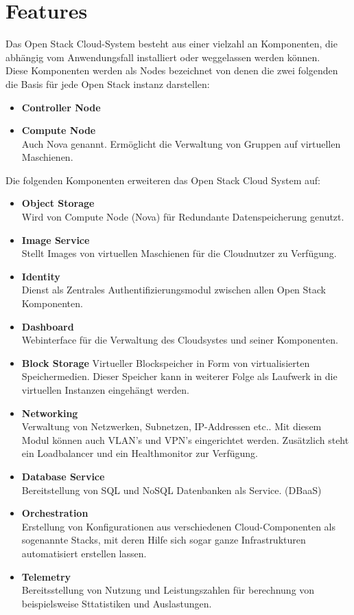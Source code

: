 \documentclass[a4paper,nochapterprefix,english,12pt]{scrreprt}
\begin{document}
\section{Features}
Das Open Stack Cloud-System besteht aus einer vielzahl an Komponenten, die abhängig vom Anwendungsfall installiert oder weggelassen werden können.\\
Diese Komponenten werden als Nodes bezeichnet von denen die zwei folgenden die Basis für jede Open Stack instanz darstellen:
\begin{itemize}
	\item \textbf{Controller Node}
	\item \textbf{Compute Node}\\
		  Auch Nova genannt. Ermöglicht die Verwaltung von Gruppen auf virtuellen Maschienen.\\
\end{itemize}
Die folgenden Komponenten erweiteren das Open Stack Cloud System auf:
\begin{itemize}
	\item \textbf{Object Storage}\\
		Wird von Compute Node (Nova) für Redundante Datenspeicherung genutzt.
	\item \textbf{Image Service}\\
		Stellt Images von virtuellen Maschienen für die Cloudnutzer zu Verfügung.
	\item \textbf{Identity}\\
		Dienst als Zentrales Authentifizierungsmodul zwischen allen Open Stack Komponenten.
	\item \textbf{Dashboard}\\
		Webinterface für die Verwaltung des Cloudsystes und seiner Komponenten.
	\item \textbf{Block Storage}
		Virtueller Blockspeicher in Form von virtualisierten Speichermedien. Dieser Speicher kann in weiterer Folge als Laufwerk in die virtuellen Instanzen eingehängt werden.
	\item \textbf{Networking}\\
		Verwaltung von Netzwerken, Subnetzen, IP-Addressen etc.. Mit diesem Modul können auch VLAN's und VPN's eingerichtet werden. Zusätzlich steht ein Loadbalancer und ein Healthmonitor zur Verfügung.
	\item \textbf{Database Service}\\
		Bereitstellung von SQL und NoSQL Datenbanken als Service. (DBaaS)
	\item \textbf{Orchestration}\\
		Erstellung von Konfigurationen aus verschiedenen Cloud-Componenten als sogenannte Stacks, mit deren Hilfe sich sogar ganze Infrastrukturen automatisiert erstellen lassen.
	\item \textbf{Telemetry}\\
		Bereitsstellung von Nutzung und Leistungszahlen für berechnung von beispielsweise Sttatistiken und Auslastungen. \cite{OS-WikiEntry} \cite{OS-NodeTrainingGuide} \cite{OS-WikiEntry}
		
\end{itemize}
\end{document}
